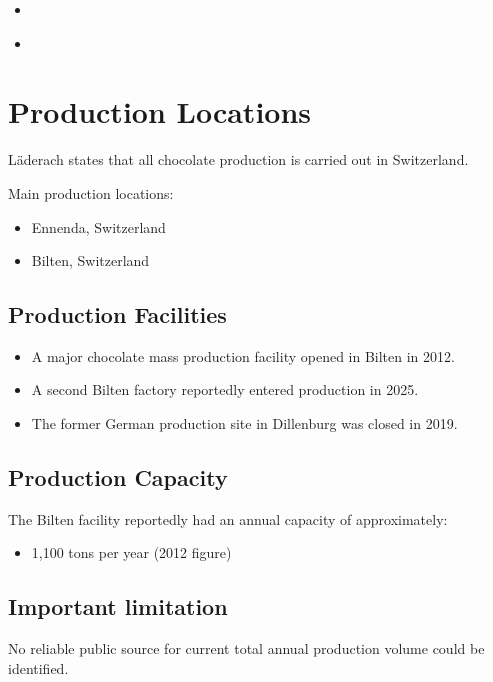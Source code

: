 \begin{itemize}
    \item \cite{leadiqLaederach}
    \item \cite{wikipediaLaederach}
\end{itemize}

\section{Production Locations}

Läderach states that all chocolate production is carried out in Switzerland.

Main production locations:

\begin{itemize}
    \item Ennenda, Switzerland
    \item Bilten, Switzerland
\end{itemize}

\subsection{Production Facilities}

\begin{itemize}
    \item A major chocolate mass production facility opened in Bilten in 2012.
    \item A second Bilten factory reportedly entered production in 2025.
    \item The former German production site in Dillenburg was closed in 2019.
\end{itemize}

\subsection{Production Capacity}

The Bilten facility reportedly had an annual capacity of approximately:

\begin{itemize}
    \item 1,100 tons per year (2012 figure)
\end{itemize}

\subsection*{Important limitation}

No reliable public source for current total annual production volume could be identified.

